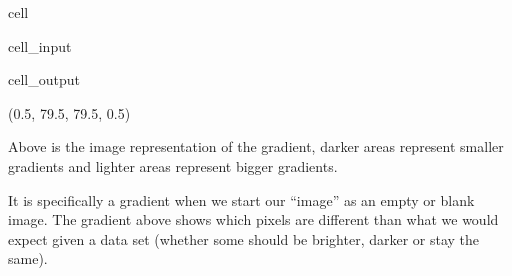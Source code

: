 \documentclass[letterpaper,10pt,english]{jupyterBook}
\begin{document}
\begin{sphinxuseclass}{cell}\begin{sphinxVerbatimInput}

\begin{sphinxuseclass}{cell_input}
\begin{sphinxVerbatim}[commandchars=\\\{\}]
   
   
    
\end{sphinxVerbatim}

\end{sphinxuseclass}\end{sphinxVerbatimInput}
\begin{sphinxVerbatimOutput}

\begin{sphinxuseclass}{cell_output}
\begin{sphinxVerbatim}[commandchars=\\\{\}]
(\PYGZhy{}0.5, 79.5, 79.5, \PYGZhy{}0.5)
\end{sphinxVerbatim}

\noindent{}

\end{sphinxuseclass}\end{sphinxVerbatimOutput}

\end{sphinxuseclass}
\sphinxAtStartPar
Above is the image representation of the gradient, darker areas represent smaller gradients and lighter areas represent bigger gradients.

\sphinxAtStartPar
It is specifically a gradient when we start our “image” as an empty or blank image. The gradient above shows which pixels are different than what we would expect given a data set (whether some should be brighter, darker or stay the same).
\end{document}
